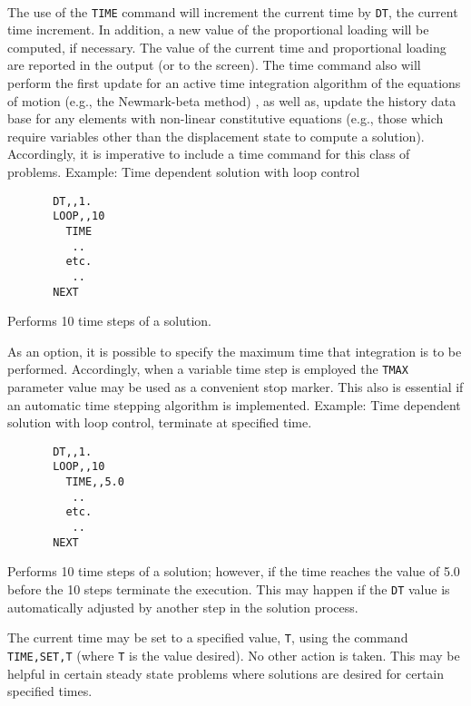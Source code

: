  \\{\smallskip}
\headb

The use of the {\tt TIME} command will increment the
current time by {\tt DT}, the current time increment.  In addition,
a new value of the proportional loading will be computed,
if necessary.  The value of the current time and proportional
loading are reported in the output (or to the
screen).  The time command also will perform the first
update for an active time integration algorithm of the equations
of motion (e.g., the Newmark-beta method) , as well
as, update the history data base for any elements with non-linear
constitutive equations (e.g., those which require
variables other than the displacement state to compute a
solution).  Accordingly, it is imperative to include a time
command for this class of problems.  Example: Time
dependent solution with loop control
\begin{verbatim}
       DT,,1.
       LOOP,,10
         TIME
          ..
         etc.
          ..
       NEXT
\end{verbatim}
Performs 10 time steps of a solution.

As an option, it is possible to specify the maximum
time that integration is to be performed.  Accordingly, when
a variable time step is employed the {\tt TMAX} parameter value may be
used as a convenient stop marker.  This also is essential if
an automatic time stepping algorithm is implemented. Example:
Time dependent solution  with  loop  control, terminate at specified time.
\begin{verbatim}
       DT,,1.
       LOOP,,10
         TIME,,5.0
          ..
         etc.
          ..
       NEXT
\end{verbatim}
Performs 10 time steps of a solution; however, if
the time reaches the value of 5.0 before the 10
steps terminate the execution.  This may happen if
the {\tt DT} value is automatically adjusted by 
another step in the solution process.

The current time may be set to a specified value, {\tt T},
using the command {\tt TIME,\-SET,\-T} (where {\tt T} is the value
desired).  No other action is taken.  This may be helpful in
certain steady state problems where solutions are desired
for certain specified times.
\vfill\eject
